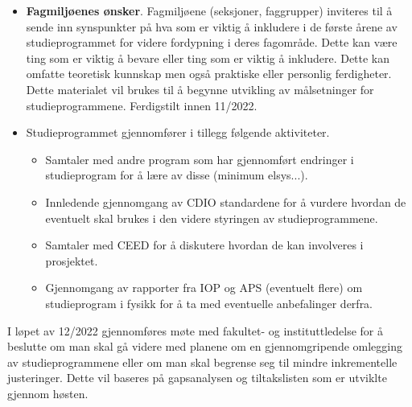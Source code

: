 \begin{itemize}
	\item \textbf{Fagmiljøenes ønsker}. Fagmiljøene (seksjoner, faggrupper) inviteres til å sende inn synspunkter på hva som er viktig å inkludere i de første årene av studieprogrammet for videre fordypning i deres fagområde. Dette kan være ting som er viktig å bevare eller ting som er viktig å inkludere. Dette kan omfatte teoretisk kunnskap men også praktiske eller personlig ferdigheter. Dette materialet vil brukes til å begynne utvikling av målsetninger for studieprogrammene. Ferdigstilt innen 11/2022.
	\item Studieprogrammet gjennomfører i tillegg følgende aktiviteter.
		\begin{itemize}
			\item Samtaler med andre program som har gjennomført endringer i studieprogram for å lære av disse (minimum elsys...).
			\item Innledende gjennomgang av CDIO standardene for å vurdere hvordan de eventuelt skal brukes i den videre styringen av studieprogrammene.
			\item Samtaler med CEED for å diskutere hvordan de kan involveres i prosjektet.
			\item Gjennomgang av rapporter fra IOP og APS (eventuelt flere) om studieprogram i fysikk for å ta med eventuelle anbefalinger derfra.
		\end{itemize}
\end{itemize}

I løpet av 12/2022 gjennomføres møte med fakultet- og instituttledelse for å beslutte om man skal gå videre med planene om en gjennomgripende omlegging av studieprogrammene eller om man skal begrense seg til mindre inkrementelle justeringer. Dette vil baseres på gapsanalysen og tiltakslisten som er utviklte gjennom høsten.











